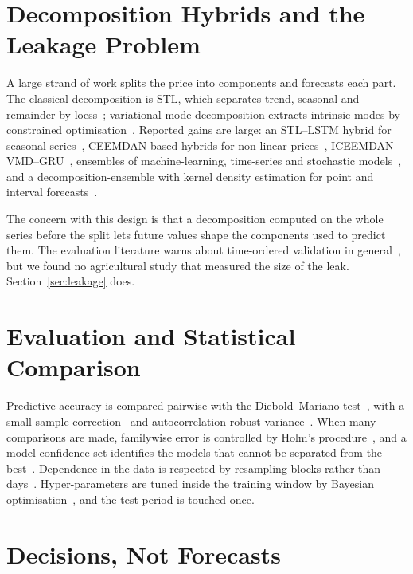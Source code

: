 \section{Decomposition Hybrids and the Leakage Problem}
\label{sec:hybrids}

A large strand of work splits the price into components and forecasts each part. The classical decomposition is STL, which separates trend, seasonal and remainder by loess~\cite{cleveland1990}; variational mode decomposition extracts intrinsic modes by constrained optimisation~\cite{dragomiretskiy2014}. Reported gains are large: an STL--LSTM hybrid for seasonal series~\cite{jaiswal2025}, CEEMDAN-based hybrids for non-linear prices~\cite{ceemdan2024}, ICEEMDAN--VMD--GRU~\cite{sathe2025}, ensembles of machine-learning, time-series and stochastic models~\cite{celik2025}, and a decomposition-ensemble with kernel density estimation for point and interval forecasts~\cite{kde2024}.

The concern with this design is that a decomposition computed on the whole series before the split lets future values shape the components used to predict them. The evaluation literature warns about time-ordered validation in general~\cite{bergmeir2012,cerqueira2020}, but we found no agricultural study that measured the size of the leak. Section~\ref{sec:leakage} does.

\section{Evaluation and Statistical Comparison}
\label{sec:evaluation}

Predictive accuracy is compared pairwise with the Diebold--Mariano test~\cite{diebold1995}, with a small-sample correction~\cite{harvey1997} and autocorrelation-robust variance~\cite{newey1987}. When many comparisons are made, familywise error is controlled by Holm's procedure~\cite{holm1979}, and a model confidence set identifies the models that cannot be separated from the best~\cite{hansen2011}. Dependence in the data is respected by resampling blocks rather than days~\cite{kunsch1989}. Hyper-parameters are tuned inside the training window by Bayesian optimisation~\cite{akiba2019}, and the test period is touched once.



\section{Decisions, Not Forecasts}
\label{sec:ml-decision}

